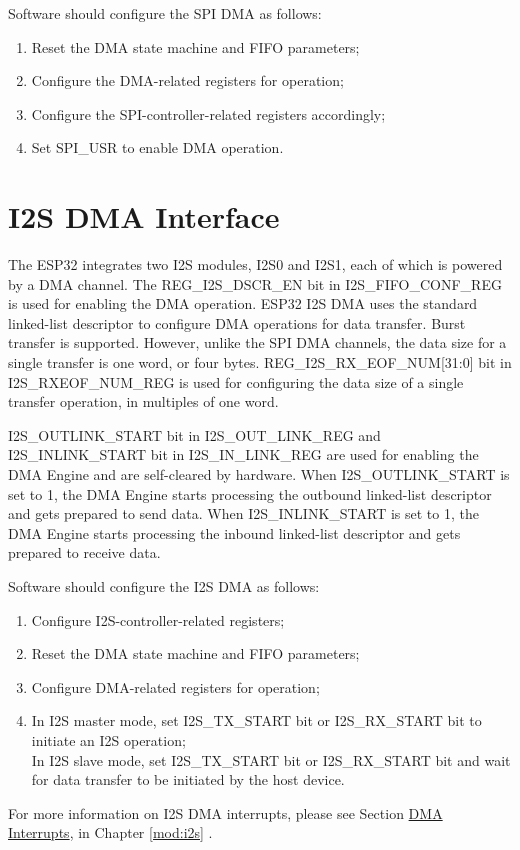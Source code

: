 \documentclass[main\_\_EN.tex]{subfiles}
\begin{document}
Software should configure the SPI DMA as follows:
\begin{enumerate}
    \item Reset the DMA state machine and FIFO parameters;
    \item Configure the DMA-related registers for operation;
    \item Configure the SPI-controller-related registers accordingly;
    \item Set SPI\_USR to enable DMA operation.
\end{enumerate}

\section{I2S DMA Interface}\label{sec:dma-i2s-dma}
The ESP32 integrates two I2S modules, I2S0 and I2S1, each of which is powered by a DMA channel. The REG\_I2S\_DSCR\_EN bit in I2S\_FIFO\_CONF\_REG is used for enabling the DMA operation. ESP32 I2S DMA uses the standard linked-list descriptor to configure DMA operations for data transfer. Burst transfer is supported. However, unlike the SPI DMA channels, the data size for a single transfer is one word, or four bytes. REG\_I2S\_RX\_EOF\_NUM[31:0] bit in I2S\_RXEOF\_NUM\_REG is used for configuring the data size of a single transfer operation, in multiples of one word.

I2S\_OUTLINK\_START bit in I2S\_OUT\_LINK\_REG and I2S\_INLINK\_START bit in I2S\_IN\_LINK\_REG are used for enabling the DMA Engine and are self-cleared by hardware. When I2S\_OUTLINK\_START is set to 1, the DMA Engine starts processing the outbound linked-list descriptor and gets prepared to send data. When I2S\_INLINK\_START is set to 1, the DMA Engine starts processing the inbound linked-list descriptor and gets prepared to receive data.

Software should configure the I2S DMA as follows:
\begin{enumerate}
    \item Configure I2S-controller-related registers;
    \item Reset the DMA state machine and FIFO parameters;
    \item Configure DMA-related registers for operation;
    \item In I2S master mode, set I2S\_TX\_START bit or I2S\_RX\_START bit to initiate an I2S operation;\\
    In I2S slave mode, set I2S\_TX\_START bit or I2S\_RX\_START bit and wait for data transfer to be initiated by the host device.
\end{enumerate}

For more information on I2S DMA interrupts, please see Section \hyperref[DMA Interrupts]{DMA Interrupts}, in Chapter \ref{mod:i2s} \textit{}.
\end{document}
